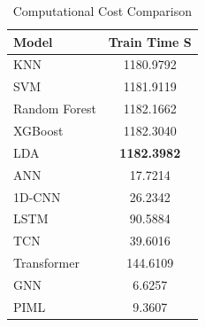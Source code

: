 \begin{table}[htbp]
\centering
\caption{Computational Cost Comparison}
\label{tab:timing}
\begin{tabular}{lc}
\toprule
Model & Train Time S \\
\midrule
KNN & 1180.9792 \\
SVM & 1181.9119 \\
Random Forest & 1182.1662 \\
XGBoost & 1182.3040 \\
LDA & \textbf{1182.3982} \\
ANN & 17.7214 \\
1D-CNN & 26.2342 \\
LSTM & 90.5884 \\
TCN & 39.6016 \\
Transformer & 144.6109 \\
GNN & 6.6257 \\
PIML & 9.3607 \\
\bottomrule
\end{tabular}
\end{table}
